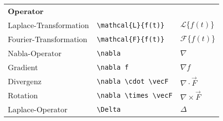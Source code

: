 \begin{table}[H]
\begin{longtable}{>{\raggedright}p{4cm} >{\raggedright}p{6cm} >{\raggedright}p{5cm}}
        \textbf{Operator}                                    &                                                                                         &                                      \\
        Laplace-Transformation                               & \texttt{\textbackslash mathcal\{L\}\{f(t)\}}                                            & \( \mathcal{L}\{f(t)\} \)            \\
        Fourier-Transformation                               & \texttt{\textbackslash mathcal\{F\}\{f(t)\}}                                            & \( \mathcal{F}\{f(t)\} \)            \\
        Nabla-Operator                                       & \texttt{\textbackslash nabla}                                                           & \( \nabla \)                         \\
        Gradient                                             & \texttt{\textbackslash nabla f}                                                         & \( \nabla f \)                       \\
        Divergenz                                            & \texttt{\textbackslash nabla \textbackslash cdot \textbackslash vec{F}}                 & \( \nabla \cdot \vec{F} \)           \\
        Rotation                                             & \texttt{\textbackslash nabla \textbackslash times \textbackslash vec{F}}                & \( \nabla \times \vec{F} \)          \\
        Laplace-Operator                                     & \texttt{\textbackslash Delta}                                                           & \( \Delta \)                         \\
    \end{longtable}
    \label{tab:operatoren}
\end{table}